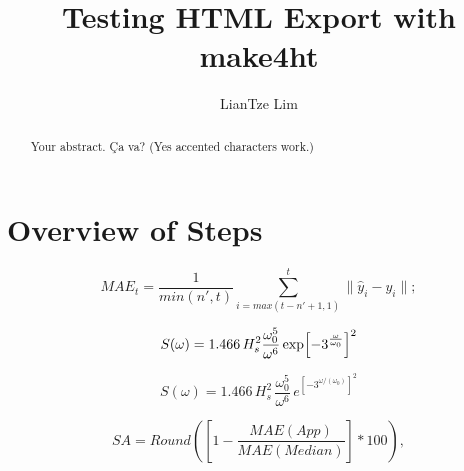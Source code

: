 \documentclass[graybox]{svmult}
\title{Testing HTML Export with make4ht}
\author{LianTze Lim}
\date{}
\begin{document}
\maketitle

\begin{abstract}
Your abstract. Ça va? (Yes accented characters work.)
\end{abstract}

\section{Overview of Steps}

\begin{equation}
MAE_t = \frac{1}{min(n',t)} \sum_{i=max(t-n'+1,1)}^{t}  \| \hat{y}_i - y_i \|; 
\end{equation}

\begin{equation}
S(\omega)=1.466\, H_s^2 \frac{\omega_0^5}{\omega^6} \exp\Bigl[-3^{\frac{\omega}{\omega_0}}\Bigr]^2
    \end{equation}
    
\begin{equation}
S(\omega)=1.466\, H_s^2 \,  \frac{\omega_0^5}{\omega^6}  \, e^{\left[-3^{\omega/(\omega_0)}\right]^2}
\end{equation}    
    
    
\begin{equation}SA = Round\left( \left[1 - \frac{MAE(App)}{MAE(Median)}\right]*100 \right),
\end{equation}
\end{document}
